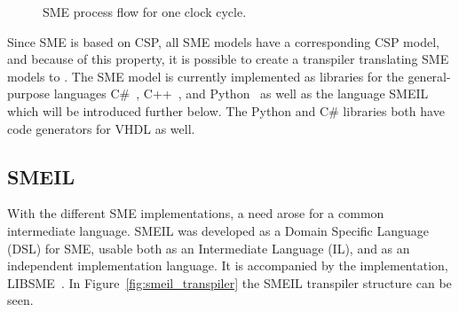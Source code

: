 \begin{figure}[!ht]
  \centering
  \caption{SME process flow for one clock cycle.}
  \label{fig:sme_process_flow}
\end{figure}
Since SME is based on CSP, all SME models have a
corresponding CSP model, and because of this property, it is possible to create a transpiler translating SME models to \cspm{}.
The SME model is currently implemented as libraries for the general-purpose languages C\#~\cite{Skovhede}, C++~\cite{asheim2015}, and Python~\cite{asheim2016vhdl} as well as the language SMEIL which will be introduced further below. The Python and C\# libraries both have code generators for VHDL as well.
\subsection{SMEIL}
\label{sec:background_smeil}
With the different SME implementations, a need arose for a common intermediate language. SMEIL was developed as a Domain Specific Language (DSL) for SME, usable both as an Intermediate Language (IL), and as an independent implementation language. It is accompanied by the implementation, LIBSME~\cite{libsme}. In Figure~\ref{fig:smeil_transpiler} the SMEIL transpiler structure can be seen.\\

